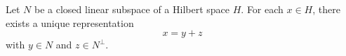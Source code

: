 Let $N$ be a closed linear subspace of a Hilbert space $H$. For each $x \in H$, there exists a unique representation
$$x = y + z$$
with $y \in N$ and $z \in N^\perp$.
